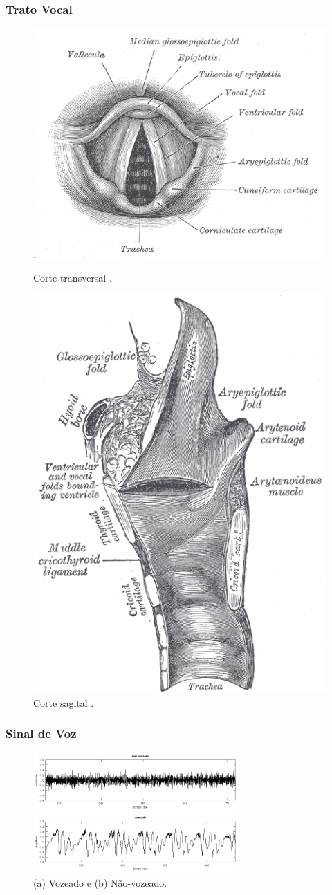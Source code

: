 \begin{frame}
  \frametitle{Trato Vocal}
\begin{figure}
\centering
\begin{minipage}{.5\textwidth}
  \centering
  \includegraphics[width=.9\linewidth]{images/vocal_folds.png}
  \caption{Corte transversal \citep{gray1918}.}
  \label{fig:vocal_folds}
\end{minipage}%
\begin{minipage}{.5\textwidth}
  \centering
  \includegraphics[width=.4\linewidth]{images/trachea.png}
  \caption{Corte sagital \citep{gray1918}.}
  \label{fig:trachea}
\end{minipage}
\end{figure}
\end{frame}

\begin{frame}
  \frametitle{Sinal de Voz}
  \begin{figure}[h]
  \centering  
  \includegraphics[width=0.7\textwidth]{images/vozeado.png}  
  \caption{(a) Vozeado e (b) Não-vozeado.}
  \label{fig:voice_unvoiced}  
  \end{figure}
\end{frame}

